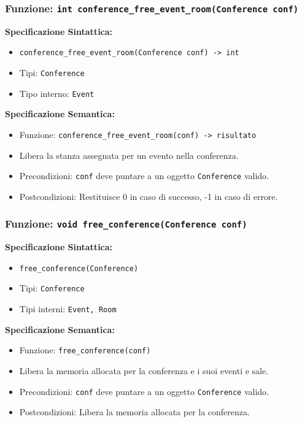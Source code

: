 \documentclass[11pt]{scrartcl} %
\begin{document}
\subsubsection{Funzione: \texttt{int conference\_free\_event\_room(Conference conf)}}

\textbf{Specificazione Sintattica:}
\begin{itemize}
\item \texttt{conference\_free\_event\_room(Conference conf) -> int}
\item Tipi: \texttt{Conference}
\item Tipo interno: \texttt{Event}
\end{itemize}

\textbf{Specificazione Semantica:}
\begin{itemize}
\item Funzione: \texttt{conference\_free\_event\_room(conf) -> risultato}
\item Libera la stanza assegnata per un evento nella conferenza.
\item Precondizioni: \texttt{conf} deve puntare a un oggetto \texttt{Conference} valido.
\item Postcondizioni: Restituisce 0 in caso di successo, -1 in caso di errore.
\end{itemize}

\subsubsection{Funzione: \texttt{void free\_conference(Conference conf)}}

\textbf{Specificazione Sintattica:}
\begin{itemize}
\item \texttt{free\_conference(Conference)}
\item Tipi: \texttt{Conference}
\item Tipi interni: \texttt{Event, Room}
\end{itemize}

\textbf{Specificazione Semantica:}
\begin{itemize}
\item Funzione: \texttt{free\_conference(conf)}
\item Libera la memoria allocata per la conferenza e i suoi eventi e sale.
\item Precondizioni: \texttt{conf} deve puntare a un oggetto \texttt{Conference} valido.
\item Postcondizioni: Libera la memoria allocata per la conferenza.
\end{itemize}
\end{document}
